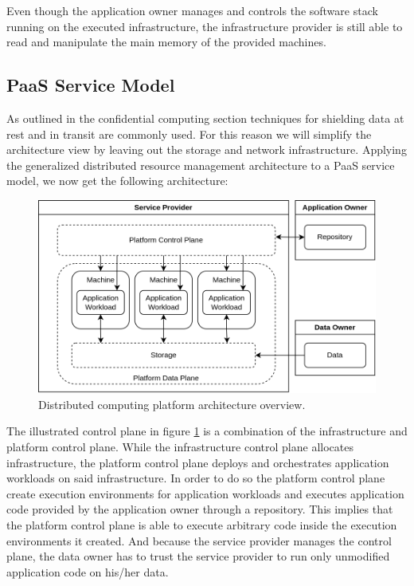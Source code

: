 Even though the application owner manages and controls the software stack
running on the executed infrastructure, the infrastructure provider is still
able to read and manipulate the main memory of the provided machines.

\subsection{PaaS Service Model}

As outlined in the confidential computing section techniques for shielding data
at rest and in transit are commonly used. For this reason we will simplify the
architecture view by leaving out the storage and network infrastructure.
Applying the generalized distributed resource management architecture to a PaaS
service model, we now get the following architecture:

\begin{figure}[ht]
  \centering
  \includegraphics[width=0.8\linewidth]{resources/distributed-computing-platform-architecture.png}
  \caption{Distributed computing platform architecture overview.}
  \label{fig:distributed-computing-platform-architecture}
\end{figure}

The illustrated control plane in figure
\ref{fig:distributed-computing-platform-architecture} is a combination of the
infrastructure and platform control plane. While the infrastructure control
plane allocates infrastructure, the platform control plane deploys and
orchestrates application workloads on said infrastructure. In order to do so the
platform control plane create execution environments for application workloads
and executes application code provided by the application owner through a
repository. This implies that the platform control plane is able to execute
arbitrary code inside the execution environments it created. And because the
service provider manages the control plane, the data owner has to trust the
service provider to run only unmodified application code on his/her data.

